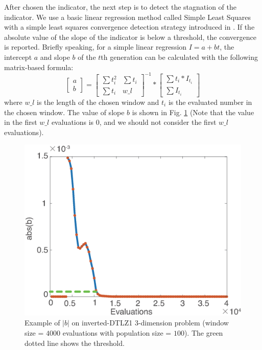 \documentclass[conference]{IEEEtran}
\begin{document}
After chosen the indicator, the next step is to detect the stagnation of the indicator.
We use a basic linear regression method called Simple Least Squares\cite{SimpleLeastSquares} with a
simple least squares convergence detection strategy introduced in \cite{convergenceDetection:LSSC}.
If the absolute value of the slope of the indicator is below a threshold, the convergence is reported.
Briefly speaking, for a simple linear regression $I=a+bt$,
the intercept $a$ and slope $b$ of the $t$th generation can be calculated 
with the following matrix-based formula:
\begin{equation}\label{elr1}
  \left[
    \begin{matrix}
      a \\
      b
    \end{matrix}
  \right]
  = 
  \left[
    \begin{matrix}
      \sum t_i^2 & \sum t_i \\
      \sum t_i   & w\_ l 
    \end{matrix}
  \right]^{-1}
  *
  \left[
    \begin{matrix}
      \sum t_i * I_{t_i} \\
      \sum I_{t_i} 
    \end{matrix}
  \right]
\end{equation}
where $w\_ l$ is the length of the chosen window 
and $t_i$ is the evaluated number in the chosen window.
The value of slope $b$ is shown in Fig. \ref{wcd2} 
(Note that the value in the first $w\_ l$ evaluations is 0, 
and we should not consider the first $w\_ l$ evaluations). 
\begin{figure}[!t]
  \centering
    \includegraphics[width=\columnwidth]{FVEMOA_IDTLZ1_M3_nadir_2}
  \caption{Example of $\lvert b\rvert$ on inverted-DTLZ1 3-dimension problem
  (window size = $4000$ evaluations with population size = $100$).
  The green dotted line shows the threshold.
  }
  \label{wcd2}
\end{figure}
\end{document}
